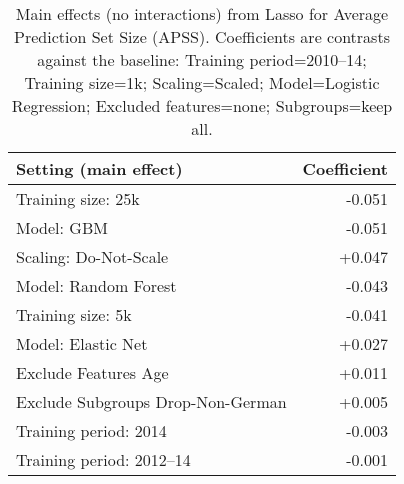 \begin{table}
\centering
\caption{Main effects (no interactions) from Lasso for Average Prediction Set Size (APSS). Coefficients are contrasts against the baseline: Training period=2010–14; Training size=1k; Scaling=Scaled; Model=Logistic Regression; Excluded features=none; Subgroups=keep all. }
\label{tab:main_effects_apss}
\begin{tabular}{l r}
\toprule
            Setting (main effect) & Coefficient \\
\midrule
               Training size: 25k &      -0.051 \\
                       Model: GBM &      -0.051 \\
            Scaling: Do-Not-Scale &      +0.047 \\
             Model: Random Forest &      -0.043 \\
                Training size: 5k &      -0.041 \\
               Model: Elastic Net &      +0.027 \\
             Exclude Features Age &      +0.011 \\
Exclude Subgroups Drop-Non-German &      +0.005 \\
            Training period: 2014 &      -0.003 \\
         Training period: 2012–14 &      -0.001 \\
\bottomrule
\end{tabular}
\end{table}
